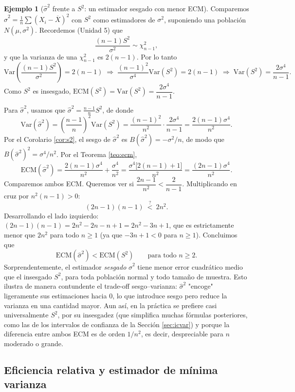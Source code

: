 \documentclass[11pt,a4paper]{article}
\theoremstyle{plain}
\theoremstyle{definition}
\newtheorem{ejemplo}[teorema]{Ejemplo}
\theoremstyle{remark}
\begin{document}
\begin{ejemplo}[$\widehat\sigma^2$ frente a $S^2$: un estimador sesgado con menor ECM]\label{ej:ecm-sigma}
Comparemos $\widehat\sigma^2=\frac1n\sum(X_i-\overline X)^2$ con $S^2$ como estimadores de $\sigma^2$, suponiendo una población $N(\mu,\sigma^2)$. Recordemos (Unidad 5) que
\[
\frac{(n-1)S^2}{\sigma^2}\sim \chi^2_{n-1},
\]
y que la varianza de una $\chi^2_{n-1}$ es $2(n-1)$. Por lo tanto
\[
\mathrm{Var}\!\left(\frac{(n-1)S^2}{\sigma^2}\right) = 2(n-1) \;\Longrightarrow\; \frac{(n-1)^2}{\sigma^4}\mathrm{Var}(S^2) = 2(n-1) \;\Longrightarrow\; \mathrm{Var}(S^2) = \frac{2\sigma^4}{n-1}.
\]
Como $S^2$ es insesgado, $\mathrm{ECM}(S^2)=\mathrm{Var}(S^2)=\dfrac{2\sigma^4}{n-1}$.

Para $\widehat\sigma^2$, usamos que $\widehat\sigma^2 = \frac{n-1}{n}S^2$, de donde
\[
\mathrm{Var}(\widehat\sigma^2) = \left(\frac{n-1}{n}\right)^2 \mathrm{Var}(S^2) = \frac{(n-1)^2}{n^2}\cdot\frac{2\sigma^4}{n-1} = \frac{2(n-1)\sigma^4}{n^2}.
\]
Por el Corolario \ref{cor:s2}, el sesgo de $\widehat\sigma^2$ es $B(\widehat\sigma^2)=-\sigma^2/n$, de modo que $B(\widehat\sigma^2)^2 = \sigma^4/n^2$. Por el Teorema \ref{teo:ecm},
\[
\mathrm{ECM}(\widehat\sigma^2) = \frac{2(n-1)\sigma^4}{n^2} + \frac{\sigma^4}{n^2} = \frac{\sigma^4\big[2(n-1)+1\big]}{n^2} = \frac{(2n-1)\sigma^4}{n^2}.
\]
Comparemos ambos ECM. Queremos ver si $\dfrac{2n-1}{n^2} < \dfrac{2}{n-1}$. Multiplicando en cruz por $n^2(n-1)>0$:
\[
(2n-1)(n-1) \ \overset{?}{<}\ 2n^2.
\]
Desarrollando el lado izquierdo: $(2n-1)(n-1) = 2n^2-2n-n+1 = 2n^2-3n+1$, que es estrictamente menor que $2n^2$ para todo $n\ge 1$ (ya que $-3n+1<0$ para $n\ge 1$). Concluimos que
\[
\mathrm{ECM}(\widehat\sigma^2) < \mathrm{ECM}(S^2) \qquad \text{para todo } n\ge 2.
\]
Sorprendentemente, el estimador \emph{sesgado} $\widehat\sigma^2$ tiene menor error cuadrático medio que el insesgado $S^2$, para toda población normal y todo tamaño de muestra. Esto ilustra de manera contundente el trade-off sesgo--varianza: $\widehat\sigma^2$ "encoge" ligeramente sus estimaciones hacia $0$, lo que introduce sesgo pero reduce la varianza en una cantidad mayor. Aun así, en la práctica se prefiere casi universalmente $S^2$, por su insesgadez (que simplifica muchas fórmulas posteriores, como las de los intervalos de confianza de la Sección \ref{sec:icvar}) y porque la diferencia entre ambos ECM es de orden $1/n^2$, es decir, despreciable para $n$ moderado o grande.
\end{ejemplo}

\subsection{Eficiencia relativa y estimador de mínima varianza}
\end{document}
